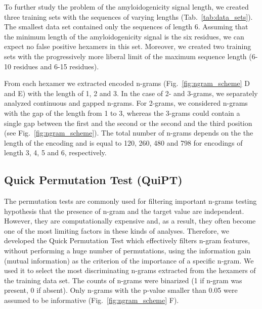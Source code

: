 \documentclass[fleqn,10pt,twoside]{gcb15submission}
\begin{document}
  To further study the problem of the amyloidogenicity signal length, we created 
three training sets with the sequences of varying lengths 
%
%
%
%
%
(Tab.~\ref{tab:data_sets}). The smallest data set contained only the sequences 
of length 6. Assuming that the minimum length of the amyloidogenicity signal is 
the six residues, we can expect no false positive hexamers in this set. Moreover, we created 
two training sets with the progressively more liberal limit of the maximum 
sequence length (6-10 residues and 6-15 residues).

  From each hexamer we extracted encoded n-grams (Fig.~\ref{fig:ngram_scheme} D and E) with 
the length of 1, 2 and 3. In the case of 2- and 3-grams, we separately analyzed 
continuous and gapped n-grams. 
For 2-grams, we considered n-grams with the gap of the length from 1 to 3, 
whereas the 3-grams could contain a single gap between the first and the second 
or the second and the third position (see Fig.~\ref{fig:ngram_scheme}). The 
total number of n-grams depends on the the length of the encoding and is equal 
to 120, 260, 480 and 798 for encodings of length 3, 4, 5 and 6, respectively.


\subsection{Quick Permutation Test (QuiPT)}

  The permutation tests are commonly used for filtering important n-grams 
testing hypothesis that the presence of n-gram and the target value are 
independent. However, they are computationally expensive and, as a result, they 
often become one of the most limiting factors in these kinds of analyses. 
Therefore, we developed the Quick Permutation Test which effectively filters 
n-gram features, without performing a huge number of permutations, using the 
information gain (mutual information) as the criterion of the importance of a 
specific n-gram. We used it to select the most discriminating n-grams extracted 
from the hexamers of the training data set. The counts of n-grams were binarized 
(1 if n-gram was present, 0 if absent). Only n-grams with the p-value smaller 
than 0.05 were assumed to be informative (Fig.~\ref{fig:ngram_scheme} F). 
%
%
%
%
%
\end{document}
